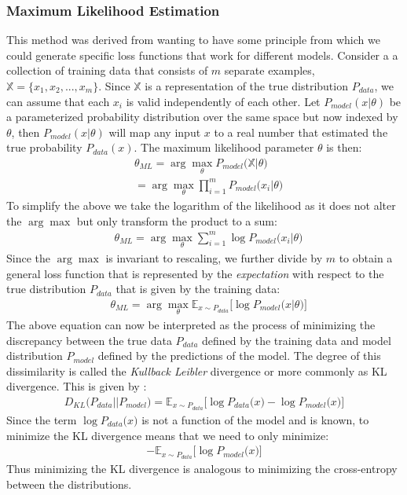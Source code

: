 \documentclass[14pt]{extarticle}
\numberwithin{equation}{section}
\begin{document}
	\subsubsection{Maximum Likelihood Estimation}
	This method was derived from wanting to have some principle from which we could generate specific loss functions that work for different models. Consider a a collection of training data that consists of $m$ separate examples, $\mathbb{X} = \{x_1, x_2, ..., x_m\}$. Since $\mathbb{X}$ is a representation of the true distribution $P_{data}$, we can assume that each $x_i$ is valid independently of each other. Let $P_{model}(x|\theta)$ be a parameterized probability distribution over the same space but now indexed by $\theta$, then $P_{model}(x|\theta)$ will map any input $x$ to a real number that estimated the true probability $P_{data}(x)$. The maximum likelihood parameter $\theta$ is then:
	\begin{align}
	&\theta_{ML} = \arg\max_{\theta}P_{model}\big(\mathbb{X}|\theta\big)\nonumber\\
	& = \arg\max_{\theta}\prod_{i=1}^{m}P_{model}\big(x_i|\theta\big)
	\end{align}		
	To simplify the above we take the logarithm of the likelihood as it does not alter the $\arg\max$ but only transform the product to a sum:
	\begin{align}
	& \theta_{ML}=\arg\max_{\theta}\sum_{i=1}^{m}\log P_{model}\big(x_i|\theta\big)
	\end{align}
	Since the $\arg\max$ is invariant to rescaling, we further divide by $m$ to obtain a general loss function that is represented by the \textit{expectation} with respect to the true distribution $P_{data}$ that is given by the training data:
	\begin{align}
	& \theta_{ML} = \arg\max_{\theta}\mathbb{E}_{x\sim P_{data}}\big[\log P_{model}\big(x|\theta\big)\big]
	\end{align}
	The above equation can now be interpreted as the process of minimizing the discrepancy between the true data $P_{data}$ defined by the training data and model distribution $P_{model}$ defined by the predictions of the model. The degree of this dissimilarity is called the \textit{Kullback Leibler} divergence or more commonly as KL divergence. This is given by :
	\begin{align}
	D_{KL}\big(P_{data}||P_{model} \big) = \mathbb{E}_{x\sim P_{data}}\big[\log P_{data}\big(x\big) - \log P_{model}\big(x\big)\big]
	\end{align}
	Since the term $\log P_{data}\big(x\big)$ is not a function of the model and is known, to minimize the KL divergence means that we need to only minimize:
	\begin{align}
	- \mathbb{E}_{x \sim P_{data}}\big[\log P_{model}\big(x\big)\big]
	\end{align}
	Thus minimizing the KL divergence is analogous to minimizing the cross-entropy between the distributions.
\end{document}
